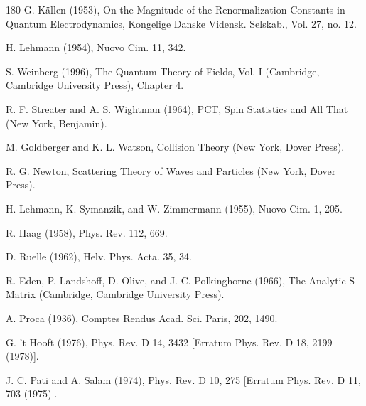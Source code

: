 \begin{thebibliography}{180}
 G. Källen (1953), On the Magnitude of the Renormalization Constants in Quantum Electrodynamics, Kongelige Danske Vidensk. Selskab., Vol. 27, no. 12.

 H. Lehmann (1954), Nuovo Cim. 11, 342.

 S. Weinberg (1996), The Quantum Theory of Fields, Vol. I (Cambridge, Cambridge University Press), Chapter 4.

 R. F. Streater and A. S. Wightman (1964), PCT, Spin Statistics and All That (New York, Benjamin).

 M. Goldberger and K. L. Watson, Collision Theory (New York, Dover Press).

 R. G. Newton, Scattering Theory of Waves and Particles (New York, Dover Press).

 H. Lehmann, K. Symanzik, and W. Zimmermann (1955), Nuovo Cim. 1, 205.

 R. Haag (1958), Phys. Rev. 112, 669.

 D. Ruelle (1962), Helv. Phys. Acta. 35, 34.

 R. Eden, P. Landshoff, D. Olive, and J. C. Polkinghorne (1966), The Analytic S-Matrix (Cambridge, Cambridge University Press).

 A. Proca (1936), Comptes Rendus Acad. Sci. Paris, 202, 1490.

 G. 't Hooft (1976), Phys. Rev. D 14, 3432 [Erratum Phys. Rev. D 18, 2199 (1978)].

 J. C. Pati and A. Salam (1974), Phys. Rev. D 10, 275 [Erratum Phys. Rev. D 11, 703 (1975)].


\end{thebibliography}
